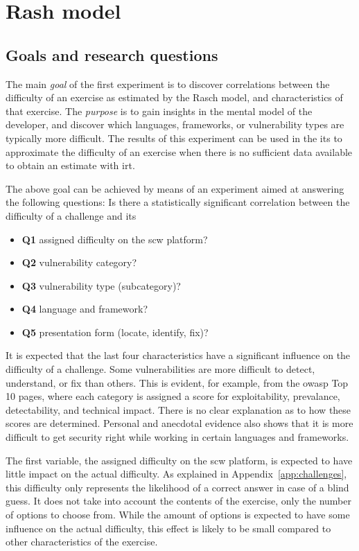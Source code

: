 \section{Rash model}
\label{sec:eval-rasch}

\subsection{Goals and research questions}
The main \textit{goal} of the first experiment is to discover correlations between the difficulty of an exercise as estimated by the Rasch model, and characteristics of that exercise.
The \textit{purpose} is to gain insights in the mental model of the developer, and discover which languages, frameworks, or vulnerability types are typically more difficult.
The results of this experiment can be used in the \gls{its} to approximate the difficulty of an exercise when there is no sufficient data available to obtain an estimate with \gls{irt}.

The above goal can be achieved by means of an experiment aimed at answering the following questions:
Is there a statistically significant correlation between the difficulty of a challenge and its
\begin{itemize}
    \item \textbf{Q1} assigned difficulty on the \gls{scw} platform?
    \item \textbf{Q2} vulnerability category?
    \item \textbf{Q3} vulnerability type (subcategory)?
    \item \textbf{Q4} language and framework?
    \item \textbf{Q5} presentation form (locate, identify, fix)?
\end{itemize}

It is expected that the last four characteristics have a significant influence on the difficulty of a challenge.
Some vulnerabilities are more difficult to detect, understand, or fix than others.
This is evident, for example, from the \gls{owasp} Top 10 pages, where each category is assigned a score for exploitability, prevalance, detectability, and technical impact.
There is no clear explanation as to how these scores are determined.
Personal and anecdotal evidence also shows that it is more difficult to get security right while working in certain languages and frameworks.

The first variable, the assigned difficulty on the \gls{scw} platform, is expected to have little impact on the actual difficulty.
As explained in Appendix~\ref{app:challenges}, this difficulty only represents the likelihood of a correct answer in case of a blind guess.
It does not take into account the contents of the exercise, only the number of options to choose from.
While the amount of options is expected to have some influence on the actual difficulty, this effect is likely to be small compared to other characteristics of the exercise.

